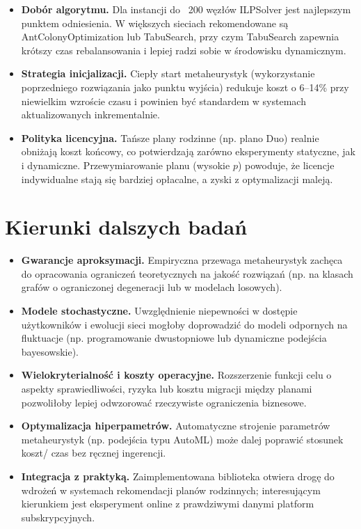 \begin{itemize}
  \item \textbf{Dobór algorytmu.} Dla instancji do ~200 węzłów ILPSolver jest najlepszym punktem odniesienia. W większych sieciach rekomendowane są AntColonyOptimization lub TabuSearch, przy czym TabuSearch zapewnia krótszy czas rebalansowania i lepiej radzi sobie w środowisku dynamicznym.
  \item \textbf{Strategia inicjalizacji.} Ciepły start metaheurystyk (wykorzystanie poprzedniego rozwiązania jako punktu wyjścia) redukuje koszt o 6--14\% przy niewielkim wzroście czasu i powinien być standardem w systemach aktualizowanych inkrementalnie.
  \item \textbf{Polityka licencyjna.} Tańsze plany rodzinne (np. plano Duo) realnie obniżają koszt końcowy, co potwierdzają zarówno eksperymenty statyczne, jak i dynamiczne. Przewymiarowanie planu (wysokie $p$) powoduje, że licencje indywidualne stają się bardziej opłacalne, a zyski z optymalizacji maleją.
\end{itemize}

\section{Kierunki dalszych badań}

\begin{itemize}
  \item \textbf{Gwarancje aproksymacji.} Empiryczna przewaga metaheurystyk zachęca do opracowania ograniczeń teoretycznych na jakość rozwiązań (np. na klasach grafów o ograniczonej degeneracji lub w modelach losowych).
  \item \textbf{Modele stochastyczne.} Uwzględnienie niepewności w dostępie użytkowników i ewolucji sieci mogłoby doprowadzić do modeli odpornych na fluktuacje (np. programowanie dwustopniowe lub dynamiczne podejścia bayesowskie).
  \item \textbf{Wielokryterialność i koszty operacyjne.} Rozszerzenie funkcji celu o aspekty sprawiedliwości, ryzyka lub kosztu migracji między planami pozwoliłoby lepiej odwzorować rzeczywiste ograniczenia biznesowe.
  \item \textbf{Optymalizacja hiperpametrów.} Automatyczne strojenie parametrów metaheurystyk (np. podejścia typu AutoML) może dalej poprawić stosunek koszt/ czas bez ręcznej ingerencji.
  \item \textbf{Integracja z praktyką.} Zaimplementowana biblioteka otwiera drogę do wdrożeń w systemach rekomendacji planów rodzinnych; interesującym kierunkiem jest eksperyment online z prawdziwymi danymi platform subskrypcyjnych.
\end{itemize}

